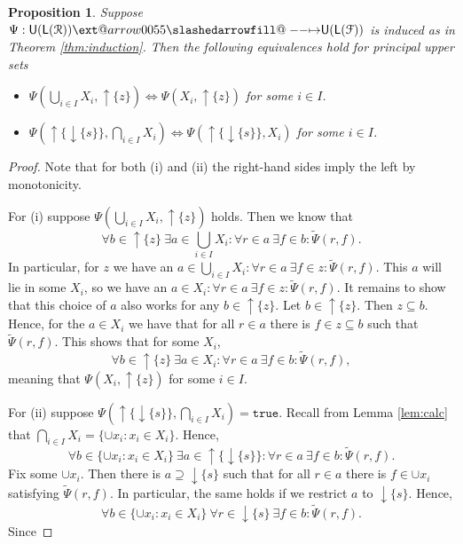 \documentclass[12pt]{article}
\makeatletter
\theoremstyle{definition}
\theoremstyle{plain}
\theoremstyle{plain}
\newtheorem{proposition}{Proposition}[section]
\theoremstyle{plain}
\theoremstyle{plain}
\theoremstyle{remark}
\theoremstyle{remark}
\newcommand{\mc}[1]{\mathcal{#1}}
\newcommand{\sub}{\subseteq}
\newcommand{\low}{\mathsf{L}}
\newcommand{\upper}{\mathsf{U}}
\newcommand{\true}{\mathtt{true}}
\newcommand{\upc}[1]{{\uparrow #1}}
\newcommand{\lwc}[1]{{\downarrow #1}}
\def\slashedarrowfill@#1#2#3#4#5{%
	$\m@th\thickmuskip0mu\medmuskip\thickmuskip\thinmuskip\thickmuskip
	\relax#5#1\mkern-7mu%
	\cleaders\hbox{$#5\mkern-2mu#2\mkern-2mu$}\hfill
	\mathclap{#3}\mathclap{#2}%
	\cleaders\hbox{$#5\mkern-2mu#2\mkern-2mu$}\hfill
	\mkern-7mu#4$%
}
\def\rightslashedarrowfill@{%
	\slashedarrowfill@\relbar\relbar\mapstochar\rightarrow}
\newcommand\xslashedrightarrow[2][]{%
	\ext@arrow 0055{\rightslashedarrowfill@}{#1}{#2}}
\makeatother
\begin{document}
\begin{proposition}\label{prop:union intersection}
	Suppose $\Psi: \upper(\low(\mc{R})) \xslashedrightarrow{} \upper(\low(\mc{F}))$ is induced as in Theorem \ref{thm:induction}. Then the following equivalences hold for principal upper sets 
	\begin{itemize}
		\item[(i)] $\Psi(\bigcup_{i \in I} X_i, \upc{\{z\}}) \Leftrightarrow \Psi(X_i,\upc{\{z\}})$ for some $i \in I$.
		\item[(ii)] $\Psi(\upc{\{\lwc{\{s\}}\}}, \bigcap_{i \in I}X_i) \Leftrightarrow \Psi(\upc{\{\lwc{\{s\}}\}},X_i)$ for some $i \in I$.
	\end{itemize}
\end{proposition}
\begin{proof}
	Note that for both (i) and (ii) the right-hand sides imply the left by monotonicity. 
	
	For (i) suppose  $\Psi(\bigcup_{i \in I} X_i, \upc{\{z\}})$ holds. Then we know that
	$$\forall b \in \upc{\{z\}} \: \exists a \in \bigcup_{i \in I} X_i: \forall r \in a \: \exists f \in b: \tilde\Psi(r,f).$$
	In particular, for $z$ we have an $a \in \bigcup_{i \in I} X_i: \forall r \in a \: \exists f \in z: \tilde\Psi(r,f).$ This $a$ will lie in some $X_i$, so we have an $a \in X_i: \forall r \in a \: \exists f \in z: \tilde\Psi(r,f).$ It remains to show that this choice of $a$ also works for any $b \in \upc{\{z\}}$. Let $b \in \upc{\{z\}}$. Then $z \sub b$. Hence, for the $a \in X_i$ we have that for all $r \in a$ there is $f \in z \sub b$ such that $\tilde\Psi(r,f)$. This shows that for some $X_i$,
	$$\forall b \in \upc{\{z\}} \: \exists a \in X_i: \forall r \in a \: \exists f \in b: \tilde\Psi(r,f),$$
	meaning that $\Psi(X_i,\upc{\{z\}})$ for some $i \in I$.
	
	For (ii) suppose $\Psi(\upc{\{\lwc{\{s\}}\}}, \bigcap_{i \in I}X_i) = \true$. Recall from Lemma \ref{lem:calc} that $\bigcap_{i \in I}X_i = \{\cup x_i : x_i  \in X_i \}$. Hence,
	$$\forall b \in \{ \cup x_i : x_i \in X_i \}\: \exists a \in \upc{\{\lwc{\{s\}}\}}: \forall r \in a \: \exists f \in b: \tilde\Psi(r,f).$$
	Fix some $\cup x_i$. Then there is $a \supseteq \lwc{\{s\}}$ such that for all $r \in a$ there is $f \in \cup x_i$ satisfying $ \tilde\Psi(r,f)$. In particular, the same holds if we restrict $a$ to $\lwc{\{s\}}$. Hence,
	$$\forall b \in \{ \cup x_i : x_i \in X_i \}\: \forall r \in \lwc{\{s\}} \: \exists f \in b: \tilde\Psi(r,f).$$
	Since 
	

\end{proof}
\end{document}
